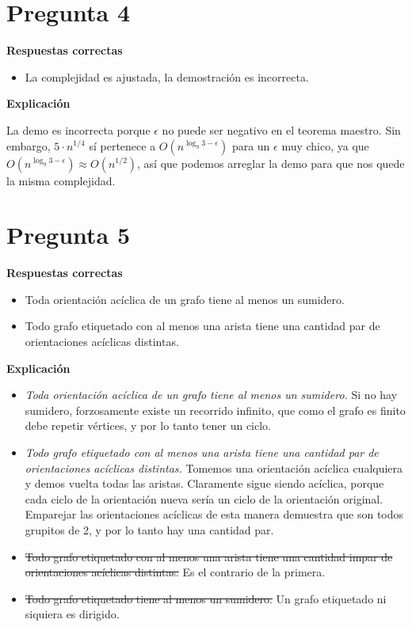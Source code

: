 \documentclass{article}
\begin{document}
\section*{Pregunta 4}
\textbf{Respuestas correctas}

\begin{itemize}
    \item La complejidad es ajustada, la demostración es incorrecta.
\end{itemize}

\textbf{Explicación}

La demo es incorrecta porque $\epsilon$ no puede ser negativo en el teorema maestro. Sin embargo, $5 \cdot n^{1/4}$ sí pertenece a $O(n^{\log_9 3-\epsilon})$ para un $\epsilon$ muy chico, ya que $O(n^{\log_9 3-\epsilon}) \approx O(n^{1/2})$, así que podemos arreglar la demo para que nos quede la misma complejidad.

\section*{Pregunta 5}
\textbf{Respuestas correctas}

\begin{itemize}
    \item Toda orientación acíclica de un grafo tiene al menos un sumidero.
    \item Todo grafo etiquetado con al menos una arista tiene una cantidad par de orientaciones acíclicas distintas.
\end{itemize}

\textbf{Explicación}

\begin{itemize}
    \item \textit{Toda orientación acíclica de un grafo tiene al menos un sumidero.} Si no hay sumidero, forzosamente existe un recorrido infinito, que como el grafo es finito debe repetir vértices, y por lo tanto tener un ciclo.
    \item \textit{Todo grafo etiquetado con al menos una arista tiene una cantidad par de orientaciones acíclicas distintas.} Tomemos una orientación acíclica cualquiera y demos vuelta todas las aristas. Claramente sigue siendo acíclica, porque cada ciclo de la orientación nueva sería un ciclo de la orientación original. Emparejar las orientaciones acíclicas de esta manera demuestra que son todos grupitos de 2, y por lo tanto hay una cantidad par.
    \item \sout{Todo grafo etiquetado con al menos una arista tiene una cantidad impar de orientaciones acíclicas distintas.} Es el contrario de la primera.
    \item \sout{Todo grafo etiquetado tiene al menos un sumidero.} Un grafo etiquetado ni siquiera es dirigido.
\end{itemize}
\end{document}
